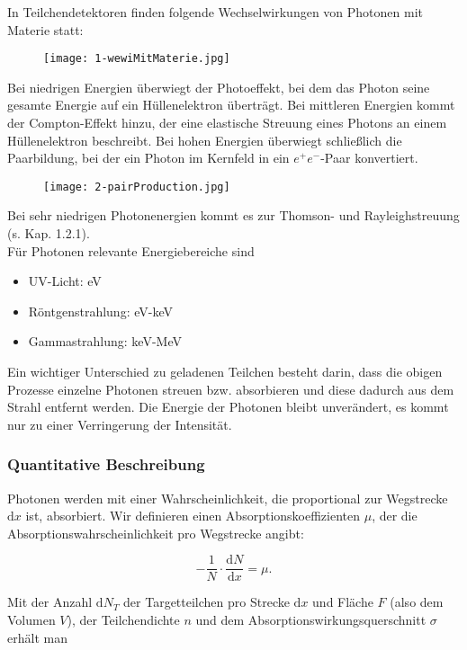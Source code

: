 In Teilchendetektoren finden folgende Wechselwirkungen von Photonen mit Materie statt:

\begin{figure}[H]
	\centering
	\texttt{[image: 1-wewiMitMaterie.jpg]}
\end{figure}

Bei niedrigen Energien überwiegt der Photoeffekt, bei dem das Photon seine gesamte Energie auf ein
Hüllenelektron überträgt. Bei mittleren Energien kommt der Compton-Effekt hinzu, der eine elastische
Streuung eines Photons an einem Hüllenelektron beschreibt. Bei hohen Energien überwiegt schließlich
die Paarbildung, bei der ein Photon im Kernfeld in ein $e^+e^-$-Paar konvertiert.

\begin{figure}[H]
	\centering
	\texttt{[image: 2-pairProduction.jpg]}
\end{figure}

Bei sehr niedrigen Photonenergien kommt es zur Thomson- und Rayleighstreuung (s. Kap. 1.2.1).
\\
Für Photonen relevante Energiebereiche sind  

\begin{itemize}
  \item UV-Licht: eV
  \item Röntgenstrahlung: eV-keV
  \item Gammastrahlung: keV-MeV
\end{itemize}

Ein wichtiger Unterschied zu geladenen Teilchen besteht darin, dass die obigen Prozesse einzelne
Photonen streuen bzw. absorbieren und diese dadurch aus dem Strahl entfernt werden. Die Energie der
Photonen bleibt unverändert, es kommt nur zu einer Verringerung der Intensität.

\subsubsection*{Quantitative Beschreibung}

Photonen werden mit einer Wahrscheinlichkeit, die proportional zur Wegstrecke $\mathrm{d}x$ ist,
absorbiert. Wir definieren einen Absorptionskoeffizienten $\mu$, der die
Absorptionswahrscheinlichkeit pro Wegstrecke angibt:

\[ -\frac{1}{N}\cdot\frac{\mathrm{d}N}{\mathrm{d}x}=\mu.\]

Mit der Anzahl $\mathrm{d}N_T$ der Targetteilchen pro Strecke $\mathrm{d}x$ und Fläche $F$ (also
dem Volumen $V$), der Teilchendichte $n$ und dem Absorptionswirkungsquerschnitt $\sigma$ erhält man

